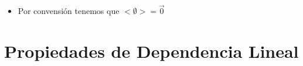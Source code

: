 \documentclass[12pt, fleqn]{report}                             %
\newenvironment{SmallIndentation}[1][0.75em]                    %
        {\begin{adjustwidth}{#1}{}\begin{footnotesize}}             %
        {\end{footnotesize}\end{adjustwidth}}                       %
\DeclareMathOperator \Space     {\quad}                         %
\theoremstyle{break}                                            %
\begin{document}
\begin{itemize}
\begin{SmallIndentation}[1em]
\begin{itemize}
                                \item
                                    Tenemos que:
                                    \begin{equation*}
                                        k \vec a 
                                            = k \sum_{i = 1}^n r_i \vec v_i
                                            = \sum_{i = 1}^n (kr_i) \vec v_i  \in <S>
                                            \Space \text{ entonces } \vec ka \in <S>
                                    \end{equation*}

                                Por lo tanto todo $<S>$ es un subespacio vectorial.

                            \end{itemize}
                        
                        \end{SmallIndentation}

                    \item
                        Por convensión tenemos que $<\emptyset> = \vec 0$

                \end{itemize}



        \clearpage
        \section{Propiedades de Dependencia Lineal}
\end{document}

